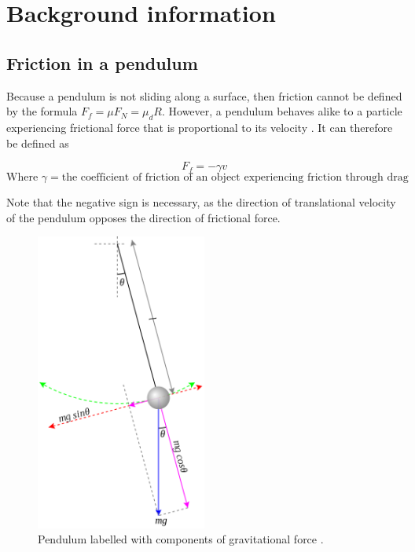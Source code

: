 \documentclass[letterpaper, 12pt]{article}
\begin{document}
\section{Background information} \label{sec:bgInfo}

\subsection{Friction in a pendulum}

Because a pendulum is not sliding along a surface,
then friction cannot be defined by the formula
\(F_f = \mu F_N = \mu_d R\). However, a pendulum
behaves alike to a particle experiencing frictional force
that is proportional to its velocity \cite{FrictionalForceProportional2021}.
It can therefore be defined as

\begin{equation} \label{eq:frictionVelocity}
    F_f = -\gamma v
\end{equation}
\[
    \text{Where } \gamma = \text{the coefficient of friction of an object experiencing friction through drag}
\]

Note that the negative sign is necessary, as the direction
of translational velocity of the pendulum
opposes the direction of frictional force.

\begin{figure}[H]
    \centering
    \includegraphics[width=0.5\textwidth]{labelledPendulum.png}
    \caption{Pendulum labelled with components of gravitational force \protect\cite{krishnavedalaEnglishDiagramDepicting2013}.}
    \label{fig:labelledPendulum}
\end{figure}
\end{document}

